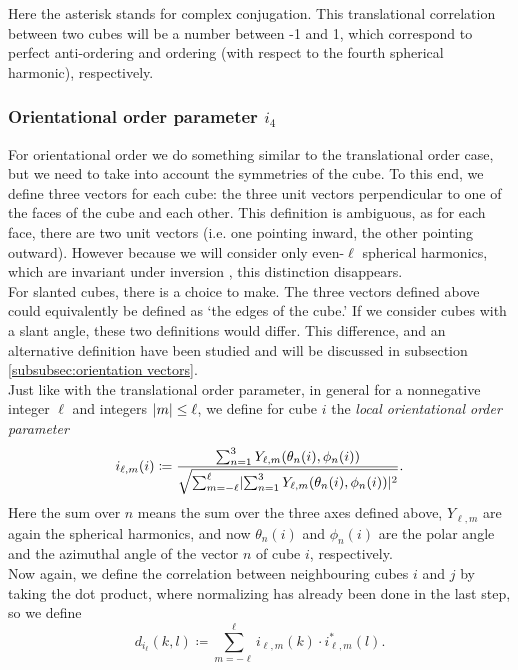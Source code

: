 \documentclass[thesis]{subfiles}
\begin{document}
Here the asterisk stands for complex conjugation. This translational correlation between two cubes will be a number between -1 and 1, which correspond to perfect anti-ordering and ordering (with respect to the fourth spherical harmonic), respectively.%

\subsubsection{Orientational order parameter \texorpdfstring{$i_4$}{i4}} \label{subsubsec:orient order param}

For orientational order we do something similar to the translational order case, but we need to take into account the symmetries of the cube. To this end, we define three vectors for each cube: the three unit vectors perpendicular to one of the faces of the cube and each other. This definition is ambiguous, as for each face, there are two unit vectors (i.e. one pointing inward, the other pointing outward). However because we will consider only even-$\ell$ spherical harmonics, which are invariant under inversion \cite{steinhardt1983bond}, this distinction disappears.\\
For slanted cubes, there is a choice to make. The three vectors defined above could equivalently be defined as `the edges of the cube.' If we consider cubes with a slant angle, these two definitions would differ. This difference, and an alternative definition have been studied and will be discussed in subsection \ref{subsubsec:orientation vectors}.%
\\
Just like with the translational order parameter, in general for a nonnegative integer $\ell$ and integers $ \lvert m\rvert \leq \ell$, we define for cube $i$ the \emph{local orientational order parameter}
\begin{equation}
i_{\ell, m}(i) \coloneqq \frac{\sum_{n = 1}^3 Y_{\ell, m}(\theta_n(i), \phi_n(i))}{\sqrt{\sum_{m = -\ell}^\ell \lvert\sum_{n = 1}^3 Y_{\ell, m}(\theta_n(i), \phi_n(i))\rvert^2}}.
\end{equation}
Here the sum over $n$ means the sum over the three axes defined above, $Y_{\ell, m}$ are again the spherical harmonics, and now $\theta_n(i)$ and $\phi_n(i)$ are the polar angle and the azimuthal angle of the vector $n$ of cube $i$, respectively.\\
Now again, we define the correlation between neighbouring cubes $i$ and $j$ by taking the dot product, where normalizing has already been done in the last step, so we define
\begin{equation}
d_{i_\ell}(k,l) \coloneqq \sum_{m = -\ell}^\ell i_{\ell, m}(k) \cdot i^*_{\ell, m}(l).
\end{equation}
\end{document}
